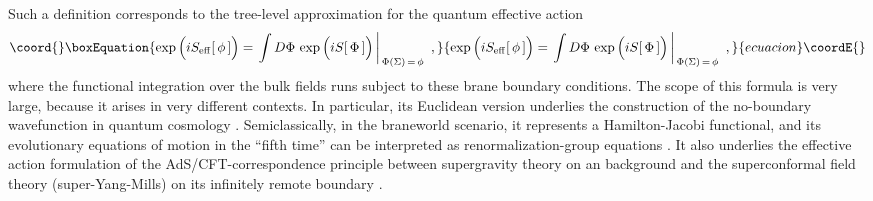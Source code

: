 \documentclass[a4paper,12pt]{article}
\begin{document}
Such a definition corresponds to the tree-level approximation for
the quantum effective action
    \begin{equation}\coord{}\boxEquation{
    \exp\Big(iS_{\rm eff}[\,\phi\,]\Big)=
    \left.\int D\Phi \,\exp\Big(iS[\,\Phi\,]\Big)\,
    \right|_{\,\Phi(\Sigma)\,=\,\phi}\,\, ,         \label{00.2}
    }{
    \exp\Big(iS_{\rm eff}[\,\phi\,]\Big)=
    \left.\int D\Phi \,\exp\Big(iS[\,\Phi\,]\Big)\,
    \right|_{\,\Phi(\Sigma)\,=\,\phi}\,\, ,         }{ecuacion}\coordE{}\end{equation}
where the functional integration over the bulk fields runs subject
to these brane boundary conditions. The scope of this formula is
very large, because it arises in very different contexts. In
particular, its Euclidean version \coordHE{}
underlies the construction of the no-boundary wavefunction in
quantum cosmology \cite{HH}. Semiclassically, in the braneworld
scenario, it represents a Hamilton-Jacobi functional, and its
evolutionary equations of motion in the ``fifth time'' \coordHE{} can be
interpreted as renormalization-group equations \cite{Verlinde}. It
also underlies the effective action formulation of the
AdS/CFT-correspondence principle between supergravity theory on an
\coordHE{} background and the superconformal field theory
(super-Yang-Mills) on its infinitely remote boundary
\cite{AdS/CFT,GKR,HHR1}.
\end{document}
